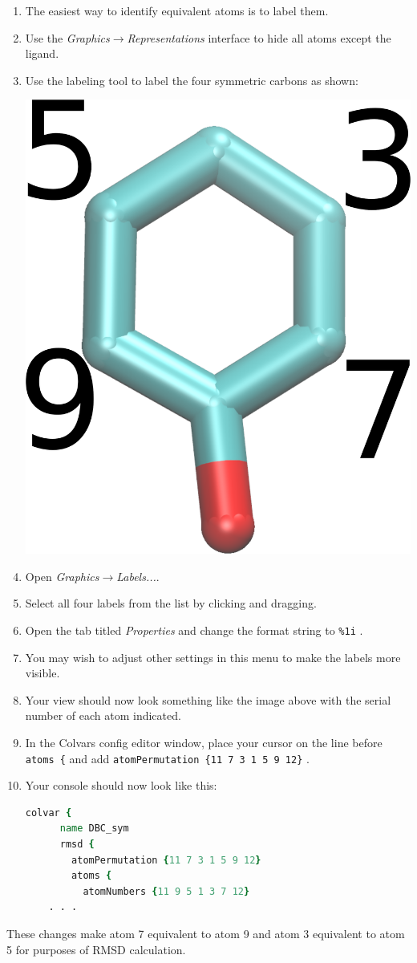 \documentclass[9pt,tutorial,pubversion]{Styling/livecoms}
\newcommand{\menu}[1]{\textit{#1}}
\newcommand{\textInput}[1]{\texttt{#1}}
\begin{document}
\begin{enumerate}
     \item The easiest way to identify equivalent atoms is to label them.
     \item Use the \menu{Graphics$\rightarrow$Representations} interface to hide all atoms except the ligand.
     \item Use the labeling tool to label the four symmetric carbons as shown:
     \begin{center}
        \includegraphics[width=0.2\linewidth]{example_symmetry_labels.png}
     \end{center}
     \item Open \menu{Graphics$\rightarrow$Labels...}.
     \item Select all four labels from the list by clicking and dragging.
     \item Open the tab titled \menu{Properties} and change the format string to \textInput{\%1i} .
     \item You may wish to adjust other settings in this menu to make the labels more visible.
     \item Your view should now look something like the image above with the serial number of each atom indicated.
     \item In the Colvars config editor window, place your cursor on the line before \textInput{atoms \{} and add \linebreak\textInput{atomPermutation \{11 7 3 1 5 9 12\}} .
     \item Your console should now look like this:
    \begin{lstlisting}[language=tcl]
    colvar {
      name DBC_sym
      rmsd {
        atomPermutation {11 7 3 1 5 9 12}
        atoms {
          atomNumbers {11 9 5 1 3 7 12}
    . . .
    \end{lstlisting}
\end{enumerate}

These changes make atom 7 equivalent to atom 9 and atom 3 equivalent to atom 5 for purposes of RMSD calculation.
\end{document}

